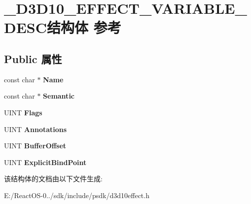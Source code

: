 \hypertarget{struct___d3_d10___e_f_f_e_c_t___v_a_r_i_a_b_l_e___d_e_s_c}{}\section{\+\_\+\+D3\+D10\+\_\+\+E\+F\+F\+E\+C\+T\+\_\+\+V\+A\+R\+I\+A\+B\+L\+E\+\_\+\+D\+E\+S\+C结构体 参考}
\label{struct___d3_d10___e_f_f_e_c_t___v_a_r_i_a_b_l_e___d_e_s_c}
\subsection*{Public 属性}
\begin{DoxyCompactItemize}
\item 
\mbox{\label{struct___d3_d10___e_f_f_e_c_t___v_a_r_i_a_b_l_e___d_e_s_c_a801bf19a3cd67ef827036254ae01547a}} 
const char $\ast$ {\bfseries Name}
\item 
\mbox{\label{struct___d3_d10___e_f_f_e_c_t___v_a_r_i_a_b_l_e___d_e_s_c_af528487afa3a4108181aedbb3ff2f57b}} 
const char $\ast$ {\bfseries Semantic}
\item 
\mbox{\label{struct___d3_d10___e_f_f_e_c_t___v_a_r_i_a_b_l_e___d_e_s_c_affd83c2b481e3637494f3152ec2e0ef4}} 
U\+I\+NT {\bfseries Flags}
\item 
\mbox{\label{struct___d3_d10___e_f_f_e_c_t___v_a_r_i_a_b_l_e___d_e_s_c_a0c8e421206bc2a92811f8c3db91e2f98}} 
U\+I\+NT {\bfseries Annotations}
\item 
\mbox{\label{struct___d3_d10___e_f_f_e_c_t___v_a_r_i_a_b_l_e___d_e_s_c_a8f7f735b0296f820efa1499e8c66487a}} 
U\+I\+NT {\bfseries Buffer\+Offset}
\item 
\mbox{\label{struct___d3_d10___e_f_f_e_c_t___v_a_r_i_a_b_l_e___d_e_s_c_af7de6e96da0f1ad10a9b889f606309b3}} 
U\+I\+NT {\bfseries Explicit\+Bind\+Point}
\end{DoxyCompactItemize}


该结构体的文档由以下文件生成\+:\begin{DoxyCompactItemize}
\item 
E\+:/\+React\+O\+S-\/0../sdk/include/psdk/d3d10effect.\+h\end{DoxyCompactItemize}
